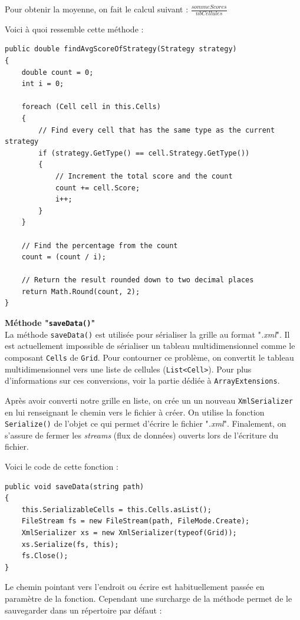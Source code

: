 \documentclass[a4paper, french]{article}
\begin{document}
Pour obtenir la moyenne, on fait le calcul suivant : $\frac{sommeScores}{nbCellules}$

Voici à quoi ressemble cette méthode :
\begin{lstlisting}
public double findAvgScoreOfStrategy(Strategy strategy)
{
    double count = 0;
    int i = 0;

    foreach (Cell cell in this.Cells)
    {
        // Find every cell that has the same type as the current strategy
        if (strategy.GetType() == cell.Strategy.GetType())
        {
            // Increment the total score and the count
            count += cell.Score;
            i++;
        }
    }

    // Find the percentage from the count
    count = (count / i);

    // Return the result rounded down to two decimal places
    return Math.Round(count, 2);
}
\end{lstlisting}

\textbf{Méthode "\texttt{saveData()}"}\\
La méthode \texttt{saveData()} est utilisée pour sérialiser la grille au format "\textit{.xml}". Il est actuellement impossible de sérialiser un tableau multidimensionnel comme le composant \texttt{Cells} de \texttt{Grid}. Pour contourner ce problème, on convertit le tableau multidimensionnel vers une liste de cellules (\texttt{List<Cell>}). Pour plus d'informations sur ces conversions, voir la partie dédiée à \texttt{ArrayExtensions}.

Après avoir converti notre grille en liste, on crée un un nouveau \texttt{XmlSerializer} en lui renseignant le chemin vers le fichier à créer. On utilise la fonction \texttt{Serialize()} de l'objet ce qui permet d'écrire le fichier "\textit{.xml}". Finalement, on s'assure de fermer les \textit{streams} (flux de données) ouverts lors de l'écriture du fichier. 

Voici le code de cette fonction :
\begin{lstlisting}
public void saveData(string path)
{
    this.SerializableCells = this.Cells.asList();
    FileStream fs = new FileStream(path, FileMode.Create);
    XmlSerializer xs = new XmlSerializer(typeof(Grid));
    xs.Serialize(fs, this);
    fs.Close();
}
\end{lstlisting}

Le chemin pointant vers l'endroit ou écrire est habituellement passée en paramètre de la fonction. Cependant une surcharge de la méthode permet de le sauvegarder dans un répertoire par défaut :
\end{document}
